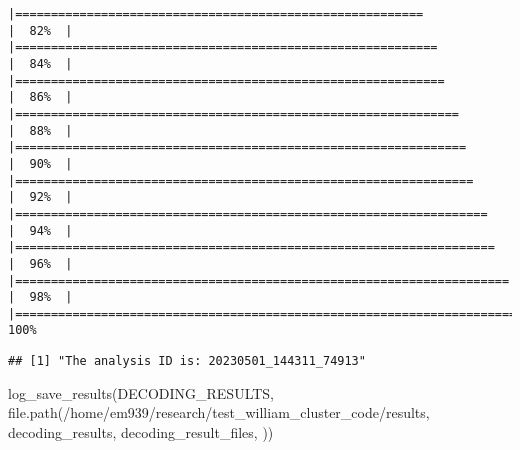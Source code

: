 \documentclass[
]{article}
\newenvironment{Shaded}{\begin{snugshade}}{\end{snugshade}}
\newcommand{\FunctionTok}[1]{\textcolor[rgb]{0.00,0.00,0.00}{#1}}
\newcommand{\NormalTok}[1]{#1}
\newcommand{\SpecialCharTok}[1]{\textcolor[rgb]{0.00,0.00,0.00}{#1}}
\newcommand{\StringTok}[1]{\textcolor[rgb]{0.31,0.60,0.02}{#1}}
\begin{document}
\begin{verbatim}
|=========================================================             |  82%  |                                                                              |===========================================================           |  84%  |                                                                              |============================================================          |  86%  |                                                                              |==============================================================        |  88%  |                                                                              |===============================================================       |  90%  |                                                                              |================================================================      |  92%  |                                                                              |==================================================================    |  94%  |                                                                              |===================================================================   |  96%  |                                                                              |===================================================================== |  98%  |                                                                              |======================================================================| 100%
\end{verbatim}

\begin{Shaded}
\end{Shaded}

\begin{verbatim}
## [1] "The analysis ID is: 20230501_144311_74913"
\end{verbatim}

\begin{Shaded}
\begin{Highlighting}[]
\FunctionTok{log\_save\_results}\NormalTok{(DECODING\_RESULTS, }
    \FunctionTok{file.path}\NormalTok{(}\StringTok{\textquotesingle{}/home/em939/research/test\_william\_cluster\_code/results\textquotesingle{}}\NormalTok{, }\StringTok{\textquotesingle{}decoding\_results\textquotesingle{}}\NormalTok{, }\StringTok{\textquotesingle{}decoding\_result\_files\textquotesingle{}}\NormalTok{, }\StringTok{\textquotesingle{}\textquotesingle{}}\NormalTok{))}
\end{Highlighting}
\end{Shaded}
\end{document}
